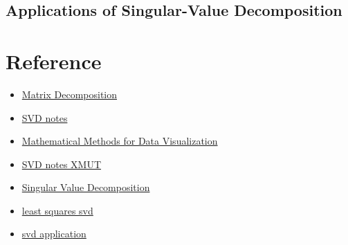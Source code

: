 \subsection{Applications of Singular-Value Decomposition}

\section{Reference}

\begin{itemize}
    \item \href{http://users.ece.northwestern.edu/~mya671/files/Matrix_YM_.pdf}{Matrix Decomposition}
    \item \href{https://math.berkeley.edu/~hutching/teach/54-2017/svd-notes.pdf}{SVD notes}
    \item \href{https://www.sjsu.edu/faculty/guangliang.chen/Math253S20.html}{Mathematical Methods for Data Visualization}
    \item \href{https://kuidu.github.io/nla/nla02.pdf}{SVD notes XMUT}
    \item \href{https://people.cas.uab.edu/~mosya/teaching/660new3.pdf}{Singular Value Decomposition}
    \item \href{https://www2.math.uconn.edu/~leykekhman/courses/MATH3795/Lectures/Lecture_9_Linear_least_squares_SVD.pdf}{least squares svd}
    \item \href{https://math.ucsd.edu/sites/math.ucsd.edu/files/undergrad/honors-program/honors-theses/2017-2018/Zecheng_Kuang_Honors_Thesis.pdf}{svd application}
\end{itemize}